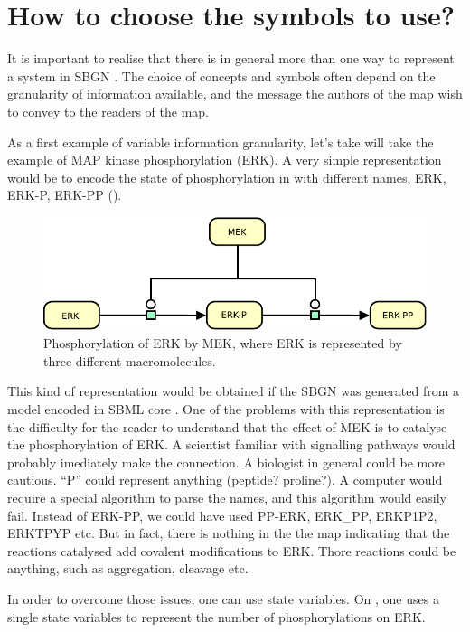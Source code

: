 \section{How to choose the symbols to use?}
\label{sec:choose}

It is important to realise that there is in general more than one way to represent a system in SBGN \PD. The choice of concepts and symbols often depend on the granularity of information available, and the message the authors of the map wish to convey to the readers of the map. 

As a first example of variable information granularity, let's take will take the example of MAP kinase phosphorylation (ERK). A very simple representation would be to encode the state of phosphorylation in  with different names, ERK, ERK-P, ERK-PP ().
 
\begin{figure}[H]
  \centering
  \includegraphics[scale = 1]{images/MAPK-NoVar}
  \caption{Phosphorylation of ERK by MEK, where ERK is represented by three different macromolecules.}
  \label{fig:MAPK-NoVar}
\end{figure}

This kind of representation would be obtained if the SBGN \PDm was generated from a model encoded in SBML core \cite{Hucka:2003}. One of the problems with this representation is the difficulty for the reader to understand that the effect of MEK is to catalyse the phosphorylation of ERK. A scientist familiar with signalling pathways would probably imediately make the connection. A biologist in general could be more cautious. ``P'' could represent anything (peptide? proline?). A computer would require a special algorithm to parse the names, and this algorithm would easily fail. Instead of ERK-PP, we could have used PP-ERK, ERK\_PP, ERKP1P2, ERKTPYP etc. But in fact, there is nothing in the the map  indicating that the reactions catalysed add covalent modifications to ERK. Thore reactions could be anything, such as aggregation, cleavage etc.

In order to overcome those issues, one can use state variables. On , one uses a single state variables to represent the number of phosphorylations on ERK. 

